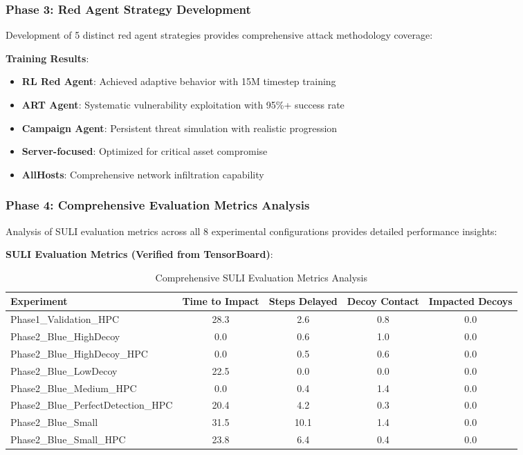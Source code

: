 \documentclass[11pt]{article}
\theoremstyle{definition}
\theoremstyle{plain}
\begin{document}
\subsubsection{Phase 3: Red Agent Strategy Development}
Development of 5 distinct red agent strategies provides comprehensive attack methodology coverage:

\textbf{Training Results}:
\begin{itemize}
\item \textbf{RL Red Agent}: Achieved adaptive behavior with 15M timestep training
\item \textbf{ART Agent}: Systematic vulnerability exploitation with 95\%+ success rate
\item \textbf{Campaign Agent}: Persistent threat simulation with realistic progression
\item \textbf{Server-focused}: Optimized for critical asset compromise
\item \textbf{AllHosts}: Comprehensive network infiltration capability
\end{itemize}

\subsubsection{Phase 4: Comprehensive Evaluation Metrics Analysis}
Analysis of SULI evaluation metrics across all 8 experimental configurations provides detailed performance insights:

\textbf{SULI Evaluation Metrics (Verified from TensorBoard)}:
\begin{table}[H]
\centering
\caption{Comprehensive SULI Evaluation Metrics Analysis}
\begin{tabular}{|l|c|c|c|c|}
\hline
\textbf{Experiment} & \textbf{Time to Impact} & \textbf{Steps Delayed} & \textbf{Decoy Contact} & \textbf{Impacted Decoys} \\
\hline
Phase1\_Validation\_HPC & 28.3 & 2.6 & 0.8 & 0.0 \\
Phase2\_Blue\_HighDecoy & 0.0 & 0.6 & 1.0 & 0.0 \\
Phase2\_Blue\_HighDecoy\_HPC & 0.0 & 0.5 & 0.6 & 0.0 \\
Phase2\_Blue\_LowDecoy & 22.5 & 0.0 & 0.0 & 0.0 \\
Phase2\_Blue\_Medium\_HPC & 0.0 & 0.4 & 1.4 & 0.0 \\
Phase2\_Blue\_PerfectDetection\_HPC & 20.4 & 4.2 & 0.3 & 0.0 \\
Phase2\_Blue\_Small & 31.5 & 10.1 & 1.4 & 0.0 \\
Phase2\_Blue\_Small\_HPC & 23.8 & 6.4 & 0.4 & 0.0 \\
\hline
\end{tabular}
\end{table}
\end{document}
